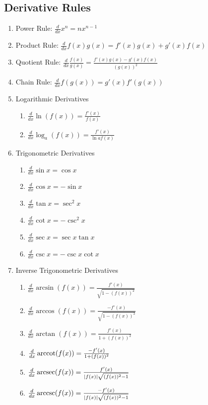 \subsection{Derivative Rules}\label{subsec:derivative-rules}

\begin{enumerate}
    \item Power Rule: $\frac{d}{dx}x^n=nx^{n-1}$
    \item Product Rule: $\frac{d}{dx}f(x)g(x)=f'(x)g(x)+g'(x)f(x)$
    \item Quotient Rule: $\frac{d}{dx}\frac{f(x)}{g(x)}=\frac{f'(x)g(x)-g'(x)f(x)}{(g(x))^2}$
    \item Chain Rule: $\frac{d}{dx}f(g(x))=g'(x)f'(g(x))$
    \item Logarithmic Derivatives
    \begin{enumerate}
        \item $\frac{d}{dx}\ln(f(x))=\frac{f'(x)}{f(x)}$
        \item $\frac{d}{dx}\log_{a}(f(x))=\frac{f'(x)}{\ln{a}f(x)}$
    \end{enumerate}
    \item Trigonometric Derivatives
    \begin{enumerate}
        \item $\frac{d}{dx}\sin{x}=\cos{x}$
        \item $\frac{d}{dx}\cos{x}=-\sin{x}$
        \item $\frac{d}{dx}\tan{x}=\sec^2{x}$
        \item $\frac{d}{dx}\cot{x}=-\csc^2{x}$
        \item $\frac{d}{dx}\sec{x}=\sec{x}\tan{x}$
        \item $\frac{d}{dx}\csc{x}=-\csc{x}\cot{x}$
    \end{enumerate}
    \item Inverse Trigonometric Derivatives
    \begin{enumerate}
        \item $\frac{d}{dx}\arcsin(f(x))=\frac{f'(x)}{\sqrt{1-(f(x))^2}}$
        \item $\frac{d}{dx}\arccos(f(x))=\frac{-f'(x)}{\sqrt{1-(f(x))^2}}$
        \item $\frac{d}{dx}\arctan(f(x))=\frac{f'(x)}{1+(f(x))^2}$
        \item $\frac{d}{dx}\operatorname{arccot}(f(x))=\frac{-f'(x)}{1+(f(x))^2}$
        \item $\frac{d}{dx}\operatorname{arcsec}(f(x))=\frac{f'(x)}{|f(x)|\sqrt{(f(x))^2-1}}$
        \item $\frac{d}{dx}\operatorname{arccsc}(f(x))=\frac{-f'(x)}{|f(x)|\sqrt{(f(x))^2-1}}$
    \end{enumerate}
\end{enumerate}

